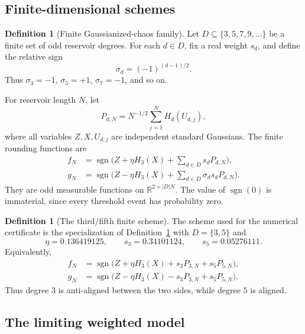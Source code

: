 \documentclass[11pt]{article}
\newcommand{\R}{\mathbb R}
\newcommand{\1}{\mathbf 1}
\newcommand{\sgn}{\operatorname{sgn}}
\theoremstyle{plain}
\theoremstyle{definition}
\newtheorem{definition}[theorem]{Definition}
\theoremstyle{remark}
\begin{document}
\subsection{Finite-dimensional schemes}\label{subsec:finite-schemes}

\begin{definition}[Finite Gaussianized-chaos family]\label{def:finite-family}
Let $D\subseteq\{3,5,7,9,\ldots\}$ be a finite set of odd reservoir degrees.  For each $d\in D$, fix a real weight $s_d$, and define the relative sign
\[
  \sigma_d=(-1)^{(d-1)/2}.
\]
Thus $\sigma_3=-1$, $\sigma_5=+1$, $\sigma_7=-1$, and so on.

For reservoir length $N$, let
\[
  P_{d,N}=N^{-1/2}\sum_{j=1}^N H_d(U_{d,j}),
\]
where all variables $Z,X,U_{d,j}$ are independent standard Gaussians.  The finite rounding functions are
\begin{align}
  f_N&=\sgn\biggl(Z+\eta H_3(X)+\sum_{d\in D}s_dP_{d,N}\biggr),\label{eq:finite-f-general}\\
  g_N&=\sgn\biggl(Z-\eta H_3(X)+\sum_{d\in D}\sigma_d s_dP_{d,N}\biggr).\label{eq:finite-g-general}
\end{align}
They are odd measurable functions on $\R^{2+|D|N}$.  The value of $\sgn(0)$ is immaterial, since every threshold event has probability zero.
\end{definition}

\begin{definition}[The third/fifth finite scheme]\label{def:finite-35}
The scheme used for the numerical certificate is the specialization of Definition~\ref{def:finite-family} with $D=\{3,5\}$ and
\begin{equation}\label{eq:params}
  \eta=0.136419125,
  \qquad
  s_3=0.34101124,
  \qquad
  s_5=0.05276111.
\end{equation}
Equivalently,
\begin{align}
  f_N&=\sgn\bigl(Z+\eta H_3(X)+s_3P_{3,N}+s_5P_{5,N}\bigr),\label{eq:finite-f-35}\\
  g_N&=\sgn\bigl(Z-\eta H_3(X)-s_3P_{3,N}+s_5P_{5,N}\bigr).\label{eq:finite-g-35}
\end{align}
Thus degree $3$ is anti-aligned between the two sides, while degree $5$ is aligned.
\end{definition}


\subsection{The limiting weighted model}\label{subsec:limiting-model}
\end{document}
